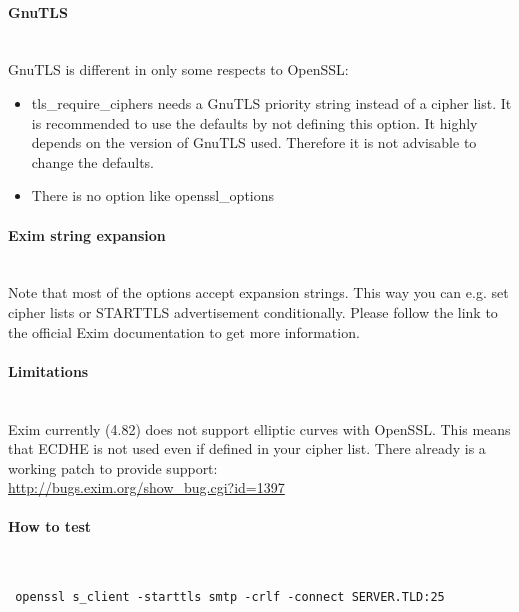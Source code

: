 \paragraph*{GnuTLS}\mbox{}\\

GnuTLS is different in only some respects to OpenSSL:
\begin{itemize}
\item tls\_require\_ciphers needs a GnuTLS priority string instead of a cipher list. It is recommended to use the defaults by not defining this option. It highly depends on the version of GnuTLS used. Therefore it is not advisable to change the defaults.
\item There is no option like openssl\_options
\end{itemize}

\paragraph*{Exim string expansion}\mbox{}\\

Note that most of the options accept expansion strings. This way you can e.g. set cipher lists or STARTTLS advertisement conditionally. Please follow the link to the official Exim documentation to get more information.

\paragraph*{Limitations}\mbox{}\\

Exim currently (4.82) does not support elliptic curves with OpenSSL. This means that ECDHE is not used even if defined in your cipher list.
There already is a working patch to provide support:\\
\url{http://bugs.exim.org/show_bug.cgi?id=1397}

\paragraph*{How to test}\mbox{}\\
\begin{lstlisting}
 openssl s_client -starttls smtp -crlf -connect SERVER.TLD:25
\end{lstlisting}






